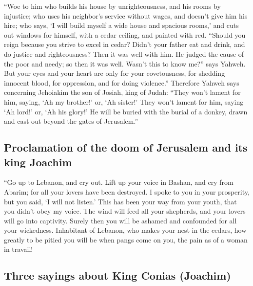  ``Woe to him who builds his house by unrighteousness,
and his rooms by injustice; who uses his neighbor's service without
wages, and doesn't give him his hire;  who says, `I will
build myself a wide house and spacious rooms,' and cuts out windows for
himself, with a cedar ceiling, and painted with red. 
``Should you reign because you strive to excel in cedar? Didn't your
father eat and drink, and do justice and righteousness? Then it was well
with him.  He judged the cause of the poor and needy; so
then it was well. Wasn't this to know me?'' says Yahweh. 
But your eyes and your heart are only for your covetousness, for
shedding innocent blood, for oppression, and for doing violence.''
 Therefore Yahweh says concerning Jehoiakim the son of
Josiah, king of Judah: ``They won't lament for him, saying, `Ah my
brother!' or, `Ah sister!' They won't lament for him, saying `Ah lord!'
or, `Ah his glory!'  He will be buried with the burial of
a donkey, drawn and cast out beyond the gates of Jerusalem.''

\hypertarget{proclamation-of-the-doom-of-jerusalem-and-its-king-joachim}{%
\subsection{Proclamation of the doom of Jerusalem and its king
Joachim}\label{proclamation-of-the-doom-of-jerusalem-and-its-king-joachim}}

 ``Go up to Lebanon, and cry out. Lift up your voice in
Bashan, and cry from Abarim; for all your lovers have been destroyed.
 I spoke to you in your prosperity, but you said, `I will
not listen.' This has been your way from your youth, that you didn't
obey my voice.  The wind will feed all your shepherds,
and your lovers will go into captivity. Surely then you will be ashamed
and confounded for all your wickedness.  Inhabitant of
Lebanon, who makes your nest in the cedars, how greatly to be pitied you
will be when pangs come on you, the pain as of a woman in travail!

\hypertarget{three-sayings-about-king-conias-joachim}{%
\subsection{Three sayings about King Conias
(Joachim)}\label{three-sayings-about-king-conias-joachim}}

